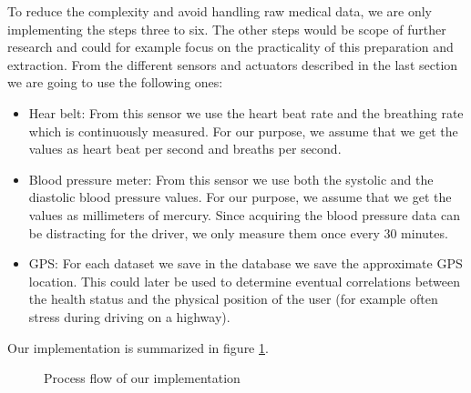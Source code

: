 To reduce the complexity and avoid handling raw medical data, we are only implementing the steps three to six. The other steps would be scope of further research and could for example focus on the practicality of this preparation and extraction.
From the different sensors and actuators described in the last section we are going to use the following ones:
\begin{itemize}
	\item Hear belt: From this sensor we use the heart beat rate and the breathing rate which is continuously measured. For our purpose, we assume that we get the values as heart beat per second and breaths per second.
	\item Blood pressure meter: From this sensor we use both the systolic and the diastolic blood pressure values. For our purpose, we assume that we get the values as millimeters of mercury. Since acquiring the blood pressure data can be distracting for the driver, we only measure them once every 30 minutes.
	\item GPS: For each dataset we save in the database we save the approximate GPS location. This could later be used to determine eventual correlations between the health status and the physical position of the user (for example often stress during driving on a highway).
\end{itemize}
Our implementation is summarized in figure \ref{fig:flow}.
\begin{figure}
	\centering
	\caption{Process flow of our implementation}
	\label{fig:flow}
\end{figure}

